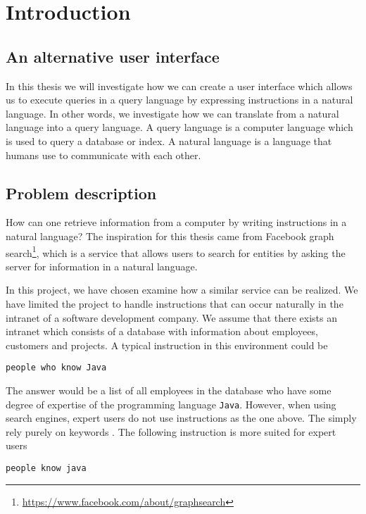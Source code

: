 \chapter{Introduction}\label{ch:introduction}
\section{An alternative user interface}
In this thesis we will investigate how we can create a user interface which allows us to execute queries in a query language by expressing instructions in a natural language. In other words, we investigate how we can translate from a natural language into a query language. A query language is a computer language which is used to query a database or index. A natural language is a language that humans use to communicate with each other.

\section{Problem description\label{sec:problem-description}}
How can one retrieve information from a computer by writing instructions in a natural language? The inspiration for this thesis came from Facebook graph search\footnote{\url{https://www.facebook.com/about/graphsearch}}, which is a service that allows users to search for entities by asking the server for information in a natural language.

In this project, we have chosen examine how a similar service can be realized. We have limited the project to handle instructions that can occur naturally in the intranet of a software development company. We assume that there exists an intranet which consists of a database with information about employees, customers and projects. A typical instruction in this environment could be

\begin{verbatim}
people who know Java
\end{verbatim}

The answer would be a list of all employees in the database who have some degree of expertise of the programming language \texttt{Java}. However, when using search engines, expert users do not use instructions as the one above. The simply rely purely on keywords \cite{mayer:2007}. The following instruction is more suited for expert users

\begin{verbatim}
people know java
\end{verbatim}

